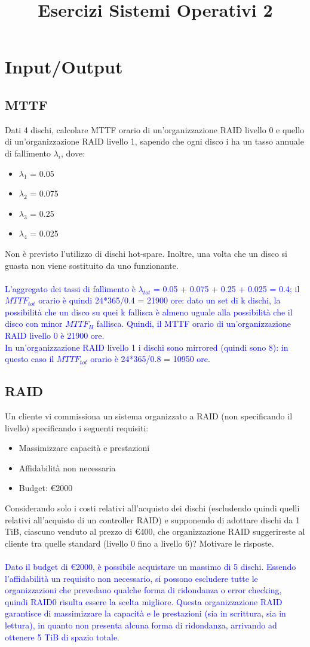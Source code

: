 \documentclass[12pt]{article}
\title{Esercizi Sistemi Operativi 2}
\begin{document}
\section{Input/Output}
\subsection{MTTF}
Dati 4 dischi, calcolare MTTF orario di un'organizzazione RAID livello 0 e quello di
un'organizzazione RAID livello 1, sapendo che ogni disco i ha un tasso annuale di fallimento $\lambda_i$,
dove:
\begin{itemize}
    \item $\lambda_1$ = 0.05
    \item $\lambda_2$ = 0.075
    \item $\lambda_3$ = 0.25
    \item $\lambda_4$ = 0.025
\end{itemize}
Non è previsto l'utilizzo di dischi hot-spare. Inoltre, una volta che un disco si guasta non viene
sostituito da uno funzionante.\\\\
\textcolor{blue}{L'aggregato dei tassi di fallimento è $\lambda_{tot}$ = 0.05 + 0.075 + 0.25 + 0.025 = 0.4; il $MTTF_{tot}$ orario è quindi 24*365/0.4 = 21900 ore: dato un set di k dischi, 
la possibilità che un disco su quei k fallisca è almeno uguale alla possibilità che il disco con minor $MTTF_H$ fallisca.
Quindi, il MTTF orario di un'organizzazione RAID livello 0 è 21900 ore.\\
In un'organizzazione RAID livello 1 i dischi sono mirrored (quindi sono 8): in questo caso il $MTTF_{tot}$ orario è 24*365/0.8 = 10950 ore.}
\subsection{RAID}
Un cliente vi commissiona un sistema organizzato a RAID (non specificando il livello) specificando i seguenti requisiti:
\begin{itemize}
    \item Massimizzare capacità e prestazioni
    \item Affidabilità non necessaria
    \item Budget: €2000
\end{itemize}
Considerando solo i costi relativi all'acquisto dei dischi (escludendo quindi quelli relativi all'acquisto di un controller RAID) e supponendo di adottare dischi da 1 TiB, ciascuno venduto al
prezzo di €400, che organizzazione RAID suggerireste al cliente tra quelle standard (livello 0 fino a livello 6)? Motivare le risposte.\\\\
\textcolor{blue}{Dato il budget di €2000, è possibile acquistare un massimo di 5 dischi. Essendo l'affidabilità un requisito non necessario, si possono escludere tutte le organizzazioni che prevedano
qualche forma di ridondanza o error checking, quindi RAID0 risulta essere la scelta migliore.
Questa organizzazione RAID garantisce di massimizzare la capacità e le prestazioni (sia in scrittura, sia in lettura), in quanto non presenta alcuna forma di ridondanza, arrivando ad ottenere
5 TiB di spazio totale.}
\end{document}
